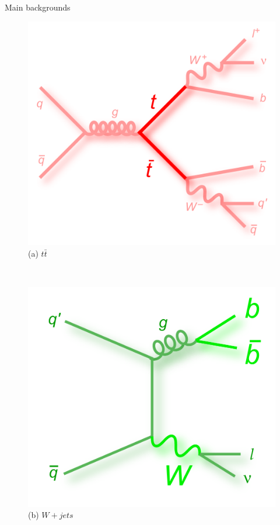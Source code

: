 \documentclass{beamer}
\begin{document}
\begin{frame}{Main backgrounds}
\begin{figure}[!h]
\centering
\begin{minipage}{.45\textwidth}
\centering
\includegraphics[height=0.8\textwidth,width=1.1\textwidth]{ttbar}
{\\(a) $t\bar{t}$}
\end{minipage}
\,\,\,\,\,\,\,\,
\begin{minipage}{.45\textwidth}
\centering
\includegraphics[height=0.8\textwidth,width=1.\textwidth]{w+jets}
{\\(b) $W+jets$}
\end{minipage}
\end{figure}
\end{frame}
\end{document}
